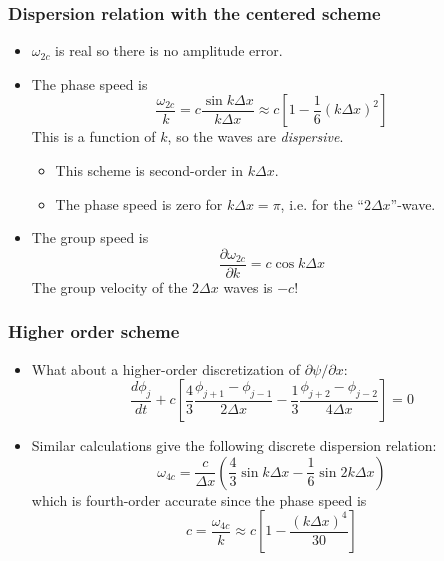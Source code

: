 \documentclass[aspectratio=149,9pt]{beamer}
\begin{document}
%
%
\begin{frame}
	\frametitle{Dispersion relation with the centered scheme}
	\vfill\begin{itemize}
		\item $\omega_{2c}$ is real so there is no amplitude error.\vfill
		\item The phase speed is
			\begin{equation*}
				\frac{\omega_{2c}}{k} = c \frac{\sin k \Delta x}{k \Delta x}\approx c \left[1 - \frac16 (k \Delta x)^2\right]
			\end{equation*}
			This is a function of $k$, so the waves are \emph{dispersive}.
			\begin{itemize}
				\item This scheme is second-order in $k \Delta x$.
				\item The phase speed is zero for $k\Delta x = \pi$, i.e. for the ``$2 \Delta x$''-wave.
			\end{itemize}\vfill
		\item The group speed is
			\begin{equation*}
				\frac{\partial \omega_{2c}}{\partial k} = c \cos k \Delta x
			\end{equation*}
			The group velocity of the $2 \Delta x$ waves is $-c$!
	\end{itemize}\vfill
\end{frame}
%
%
\begin{frame}
	\frametitle{Higher order scheme}
	\vfill\begin{itemize}
		\item What about a higher-order discretization of $\partial\psi/\partial x$:
			\begin{equation*}
				\frac{d \phi_j}{dt} + c \left[ \frac43 \frac{\phi_{j+1} - \phi_{j-1}}{2 \Delta x} 
					- \frac13 \frac{\phi_{j+2} - \phi_{j-2}}{4 \Delta x} \right] = 0
			\end{equation*}\vfill
		\item Similar calculations give the following discrete dispersion relation:
			\begin{equation*}
				\omega_{4c} = \frac{c}{\Delta x} \left( \frac43 \sin k \Delta x -    \frac16 \sin 2 k \Delta x \right)
			\end{equation*}
			which is fourth-order accurate since the phase speed is
			\begin{equation*}
				c = \frac{\omega_{4c}}{k} \approx c \left[ 1 - \frac{( k \Delta x)^4}{30} \right]
			\end{equation*}
	\end{itemize}\vfill
\end{frame}
\end{document}
